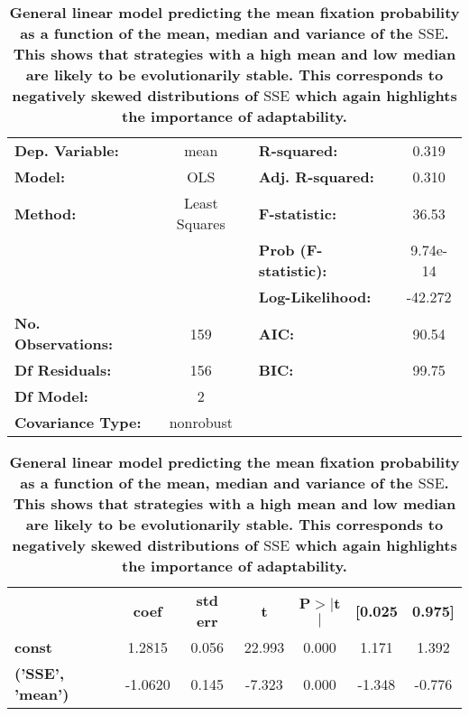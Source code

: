 \documentclass[10pt,letterpaper]{article}
\newlength\savedwidth
\newcommand\thickhline{\noalign{\global\savedwidth\arrayrulewidth\global\arrayrulewidth 2pt}%
\hline
\noalign{\global\arrayrulewidth\savedwidth}}
\newcommand{\SSe}{\text{SSE}}
\begin{document}
\begin{table}[!hbtp]
    \centering
        \caption{{\bf General linear model predicting the mean fixation probability as a
    function of the mean, median and variance of the \(\SSe\). This shows that strategies with a high mean
        and low median are likely to be evolutionarily stable. This corresponds
        to negatively skewed distributions of \(\SSe\) which again highlights
        the importance of adaptability.}}
    \label{tbl:compare-fixation-to-sserror}
\begin{tabular}{lclc}
\hline
\textbf{Dep. Variable:}    &       mean       & \textbf{  R-squared:         } &    0.319  \\
\textbf{Model:}            &       OLS        & \textbf{  Adj. R-squared:    } &    0.310  \\
\textbf{Method:}           &  Least Squares   & \textbf{  F-statistic:       } &    36.53  \\
                           &                  & \textbf{  Prob (F-statistic):} & 9.74e-14  \\
                           &                  & \textbf{  Log-Likelihood:    } &  -42.272  \\
\textbf{No. Observations:} &         159      & \textbf{  AIC:               } &    90.54  \\
\textbf{Df Residuals:}     &         156      & \textbf{  BIC:               } &    99.75  \\
\textbf{Df Model:}         &           2      & \textbf{                     } &           \\
\textbf{Covariance Type:}  &    nonrobust     & \textbf{                     } &           \\
\hline
\end{tabular}
\begin{tabular}{lcccccc}
\hline
                                & \textbf{coef} & \textbf{std err} & \textbf{t} & \textbf{P$>$$|$t$|$} & \textbf{[0.025} & \textbf{0.975]}  \\
\thickhline
\textbf{const}                  &       1.2815  &        0.056     &    22.993  &         0.000        &        1.171    &        1.392     \\
\textbf{('SSE', 'mean')}   &      -1.0620  &        0.145     &    -7.323  &         0.000        &       -1.348    &       -0.776     \\

\end{tabular}
\end{table}
\end{document}
